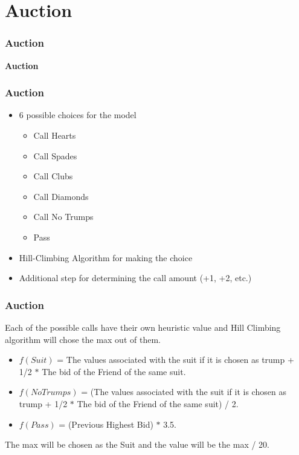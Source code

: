 \documentclass{beamer}
\begin{document}
\section{Auction} 

\begin{frame}\frametitle{Auction}
    \begin{center}
        \textbf{Auction}
    \end{center}
\end{frame}


\begin{frame}\frametitle{Auction}
    \begin{center}
        \begin{itemize}
            \item 6 possible choices for the model
                \begin{itemize}
                    \item Call Hearts
                    \item Call Spades
                    \item Call Clubs
                    \item Call Diamonds
                    \item Call No Trumps
                    \item Pass
                \end{itemize}
            \item Hill-Climbing Algorithm for making the choice
            \item Additional step for determining the call amount (+1, +2, etc.)
        \end{itemize}
    \end{center}
\end{frame}

\begin{frame}\frametitle{Auction}
    Each of the possible calls have their own heuristic value and Hill Climbing algorithm will chose the max out of them.

    \begin{itemize}
    \item $f(Suit)$ = The values associated with the suit if it is chosen as trump + 1/2 $*$ The bid of the Friend of the same suit.
    \item $f(NoTrumps)$ = (The values associated with the suit if it is chosen as trump + 1/2 $*$ The bid of the Friend of the same suit) / 2.
    \item $f(Pass)$ = (Previous Highest Bid) $*$ 3.5.
    \end{itemize}

    The max will be chosen as the Suit and the value will be the max / 20.

    

\end{frame}
\end{document}
